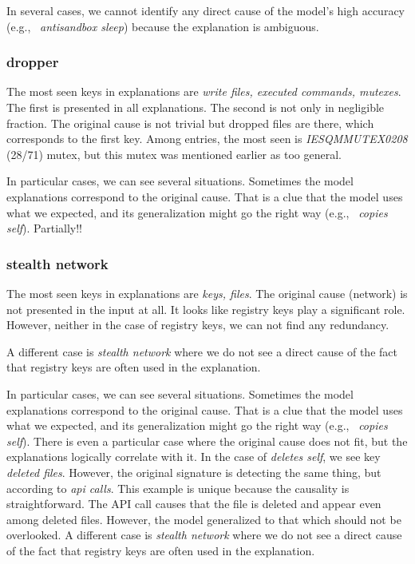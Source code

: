 In several cases, we cannot identify any direct cause of the model's high accuracy (e.g., \ \emph{antisandbox sleep}) because the explanation is ambiguous.

\subsubsection*{dropper}
The most seen keys in explanations are \emph{write files, executed commands, mutexes}. The first is presented in all explanations. The second is not only in negligible fraction. The original cause is not trivial but dropped files are there, which corresponds to the first key. Among entries, the most seen is \emph{IESQMMUTEX0208} (28/71) mutex, but this mutex was mentioned earlier as too general.

In particular cases, we can see several situations. Sometimes the model explanations correspond to the original cause. That is a clue that the model uses what we expected, and its generalization might go the right way (e.g., \ \emph{copies self}). Partially!!

\subsubsection*{stealth network}
The most seen keys in explanations are \emph{keys, files}. The original cause (network) is not presented in the input at all. It looks like registry keys play a significant role. However, neither in the case of registry keys, we can not find any redundancy.

A different case is \emph{stealth network} where we do not see a direct cause of the fact that registry keys are often used in the explanation.

\hfill \break


In particular cases, we can see several situations. Sometimes the model explanations correspond to the original cause. That is a clue that the model uses what we expected, and its generalization might go the right way (e.g., \ \emph{copies self}). There is even a particular case where the original cause does not fit, but the explanations logically correlate with it. In the case of \emph{deletes self}, we see key \emph{deleted files}. However, the original signature is detecting the same thing, but according to \emph{api calls}. This example is unique because the causality is straightforward. The API call causes that the file is deleted and appear even among deleted files. However, the model generalized to that which should not be overlooked. A different case is \emph{stealth network} where we do not see a direct cause of the fact that registry keys are often used in the explanation.

